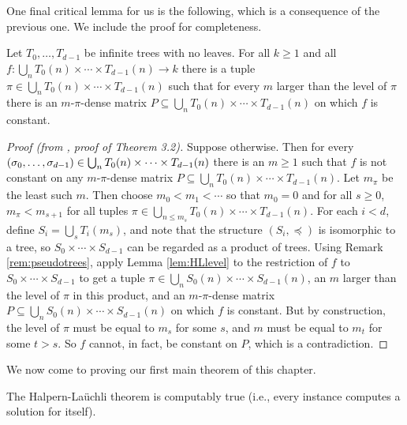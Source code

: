 One final critical lemma for us is the following, which is a consequence of the previous one. We include the proof for completeness.

\begin{lemma}\label{lem:HLdensity}
	Let $T_0,\ldots,T_{d-1}$ be infinite trees with no leaves. For all $k \geq 1$ and all $f: \bigcup_{n} T_0(n) \times \cdots \times T_{d-1}(n) \to k$ there is a tuple $\pi \in \bigcup_{n} T_0(n) \times \cdots \times T_{d-1}(n)$ such that for every $m$ larger than the level of $\pi$ there is an $m$-$\pi$-dense matrix $P \subseteq \bigcup_{n} T_0(n) \times \cdots \times T_{d-1}(n)$ on which $f$ is constant.
\end{lemma}

\begin{proof}[Proof (from \cite{Todorcevic2010Ramsey}, proof of Theorem 3.2)]
	Suppose otherwise. Then for every $( \sigma_0,\ldots,\sigma_{d-1} ) \in \bigcup_n T_0(n) \times \cdots \times T_{d-1}(n)$ there is an $m \geq 1$ such that $f$ is not constant on any $m$-$\pi$-dense matrix $P \subseteq \bigcup_{n} T_0(n) \times \cdots \times T_{d-1}(n)$. Let $m_\pi$ be the least such $m$. Then choose $m_0 < m_1 < \cdots$ so that $m_0 = 0$ and for all $s \geq 0$, $m_\pi < m_{s+1}$ for all tuples $\pi \in \bigcup_{n \leq m_s} T_0(n) \times \cdots \times T_{d-1}(n)$. For each $i < d$, define $S_i = \bigcup_s T_i(m_s)$, and note that the structure $(S_i,\preceq)$ is isomorphic to a tree, so $S_0 \times \cdots \times S_{d-1}$ can be regarded as a product of trees. Using Remark \ref{rem:pseudotrees}, apply Lemma \ref{lem:HLlevel} to the restriction of $f$ to $S_0 \times \cdots \times S_{d-1}$ to get a tuple $\pi \in \bigcup_n S_0(n) \times \cdots \times S_{d-1}(n)$, an $m$ larger than the level of $\pi$ in this product, and an $m$-$\pi$-dense matrix $P \subseteq \bigcup_n S_0(n) \times \cdots \times S_{d-1}(n)$ on which $f$ is constant. But by construction, the level of $\pi$ must be equal to $m_s$ for some $s$, and $m$ must be equal to $m_t$ for some $t > s$. So $f$ cannot, in fact, be constant on $P$, which is a contradiction.
\end{proof}

We now come to proving our first main theorem of this chapter.

\begin{theorem}\label{thm:halpern-lauchli-computably-true}
 The Halpern-La\"{u}chli theorem is computably true (i.e., every instance computes a solution for itself).
\end{theorem}

